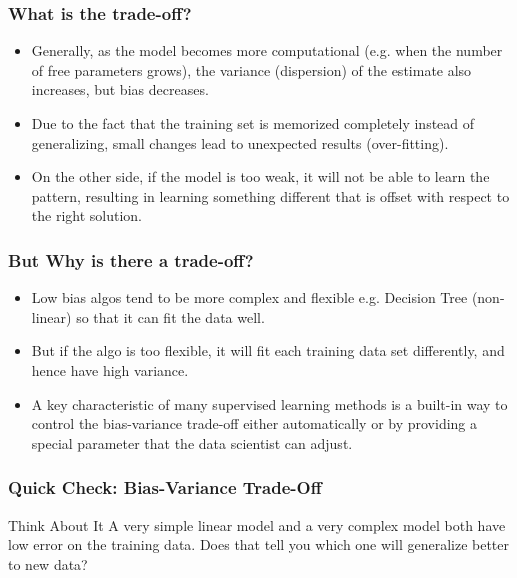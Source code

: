 \begin{frame}[fragile]\frametitle{What is the trade-off?}
\begin{itemize}
\item Generally, as the model becomes more computational (e.g. when the number of free parameters grows), the variance (dispersion) of the estimate also increases, but bias decreases. 
\item Due to the fact that the training set is memorized completely instead of generalizing, small changes lead to unexpected results (over-fitting). 
\item On the other side, if the model is too weak, it will not be able to learn the pattern, resulting in learning something different that is offset with respect to the right solution.

\end{itemize}
\end{frame}


\begin{frame}[fragile]\frametitle{But Why is there a trade-off?}
\begin{itemize}
\item Low bias algos tend to be more complex and flexible e.g. Decision Tree (non-linear) so that it can fit the data well. 
\item But if the algo is too flexible, it will fit each training data set differently, and hence have high variance.
\item A key characteristic of many supervised learning methods is a built-in way to control the bias-variance trade-off either automatically or by providing a special parameter that the data scientist can adjust.

\end{itemize}
\end{frame}

\begin{frame}[fragile]\frametitle{Quick Check: Bias-Variance Trade-Off}
\begin{block}{Think About It}
A very simple linear model and a very complex model both have low error on the training data. Does that tell you which one will generalize better to new data?
\end{block}
\end{frame}

